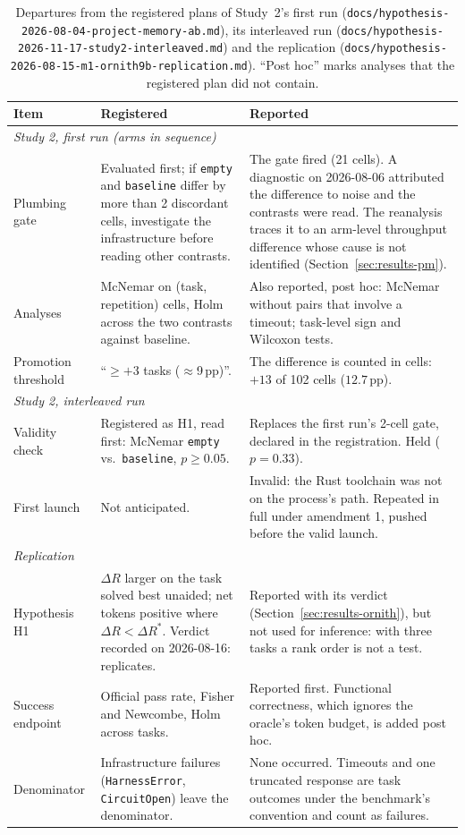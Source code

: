 \documentclass[smallcondensed,natbib]{svjour3}
\begin{document}
\begin{table}
\caption{Departures from the registered plans of Study~2's first run
(\texttt{docs/hypothesis-2026-08-04-project-memory-ab.md}), its
interleaved run (\texttt{docs/hypothesis-2026-11-17-study2-interleaved.md})
and the replication
(\texttt{docs/hypothesis-2026-08-15-m1-ornith9b-replication.md}).
``Post hoc'' marks analyses that the registered plan did not contain.}
\label{tab:deviations}
\small
\begin{tabular}{p{}p{}p{}}
\toprule
Item & Registered & Reported \\
\midrule
\multicolumn{3}{l}{\emph{Study 2, first run (arms in sequence)}} \\
Plumbing gate & Evaluated first; if \texttt{empty} and
\texttt{baseline} differ by more than 2 discordant cells, investigate
the infrastructure before reading other contrasts. & The gate fired
(21 cells). A diagnostic on 2026-08-06 attributed the difference to
noise and the contrasts were read. The reanalysis traces it to an
arm-level throughput difference whose cause is not identified
(Section~\ref{sec:results-pm}). \\
Analyses & McNemar on (task, repetition) cells, Holm across the two
contrasts against baseline. & Also reported, post hoc: McNemar without
pairs that involve a timeout; task-level sign and Wilcoxon tests. \\
Promotion threshold & ``$\geq +3$ tasks ($\approx$9\,pp)''. & The
difference is counted in cells: $+13$ of 102 cells ($12.7$\,pp). \\
\midrule
\multicolumn{3}{l}{\emph{Study 2, interleaved run}} \\
Validity check & Registered as H1, read first: McNemar \texttt{empty}
vs.\ \texttt{baseline}, $p\geq0.05$. & Replaces the first run's
2-cell gate, declared in the registration. Held ($p=0.33$). \\
First launch & Not anticipated. & Invalid: the Rust toolchain was not
on the process's path. Repeated in full under amendment 1, pushed
before the valid launch. \\
\midrule
\multicolumn{3}{l}{\emph{Replication}} \\
Hypothesis H1 & $\Delta R$ larger on the task solved best unaided;
net tokens positive where $\Delta R < \Delta R^{*}$. Verdict recorded
on 2026-08-16: replicates. & Reported with its verdict
(Section~\ref{sec:results-ornith}), but not used for inference: with
three tasks a rank order is not a test. \\
Success endpoint & Official pass rate, Fisher and Newcombe, Holm across
tasks. & Reported first. Functional correctness, which ignores the
oracle's token budget, is added post hoc. \\
Denominator & Infrastructure failures (\texttt{HarnessError},
\texttt{CircuitOpen}) leave the denominator. & None occurred. Timeouts
and one truncated response are task outcomes under the benchmark's
convention and count as failures. \\
\bottomrule
\end{tabular}
\end{table}
\end{document}

